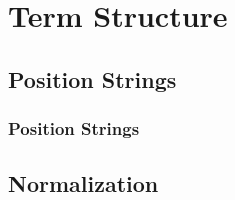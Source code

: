 
\section{Term Structure}

\subsection{Position Strings}
\begin{frame}
	\frametitle{Position Strings}
	
\end{frame}

\subsection{Normalization}
\begin{frame}
	
	
\end{frame}
